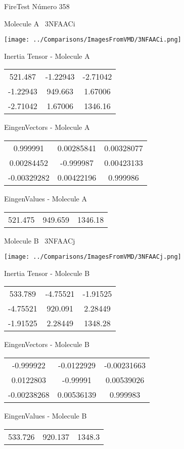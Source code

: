 \vtab[-3cm]
\begin{center}
{\large FireTest \tab Número 358}
\end{center}
\begin{multicols}{2}
\begin{center}

Molecule A \
3NFAACi

\texttt{[image: ../Comparisons/ImagesFromVMD/3NFAACi.png]}

Inertia Tensor - Molecule A \\
\begin{tabular}{|c c c|}
521.487	 & 	-1.22943	 & 	-2.71042	 \\
-1.22943	 & 	949.663	 & 	1.67006	 \\
-2.71042	 & 	1.67006	 & 	1346.16
\end{tabular}

\vtab
 EingenVectors - Molecule A     \\
\begin{tabular}{|c c c|}
0.999991	 & 	0.00285841	 & 	0.00328077	 \\
0.00284452	 & 	-0.999987	 & 	0.00423133	 \\
-0.00329282	 & 	0.00422196	 & 	0.999986
\end{tabular}

\vtab
 EingenValues - Molecule A     \\
\begin{tabular}{|c c c|}
521.475	 & 	949.659	 & 	1346.18	 \\
\end{tabular}
\columnbreak

Molecule B \
3NFAACj

\texttt{[image: ../Comparisons/ImagesFromVMD/3NFAACj.png]}

Inertia Tensor - Molecule B \\
\begin{tabular}{|c c c|}
533.789	 & 	-4.75521	 & 	-1.91525	 \\
-4.75521	 & 	920.091	 & 	2.28449	 \\
-1.91525	 & 	2.28449	 & 	1348.28
\end{tabular}

\vtab
 EingenVectors - Molecule B     \\
\begin{tabular}{|c c c|}
-0.999922	 & 	-0.0122929	 & 	-0.00231663	 \\
0.0122803	 & 	-0.99991	 & 	0.00539026	 \\
-0.00238268	 & 	0.00536139	 & 	0.999983
\end{tabular}

\vtab
 EingenValues - Molecule B     \\
\begin{tabular}{|c c c|}
533.726	 & 	920.137	 & 	1348.3	 \\
\end{tabular}

\end{center}
\end{multicols}

